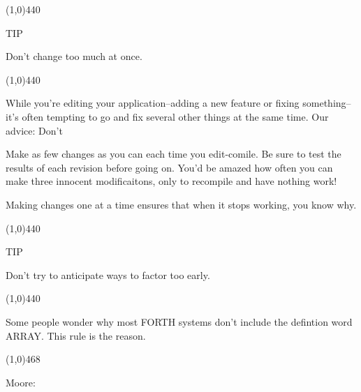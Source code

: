 \documentclass{book}
\begin{document}
\line(1,0){440} 

TIP 

Don't change too much at once.

\line(1,0){440}

\bigskip

\noindent
While you're editing your application--adding a new feature or fixing something--it's often tempting to go and fix several other things at the same time. Our advice: Don't

Make as few changes as you can each time you edit-comile. Be sure to test the results of each revision before going on. You'd be amazed how often you can make three innocent modificaitons, only to recompile and have nothing work!

Making changes one at a time ensures that when it stops working, you know why.

\line(1,0){440} 

TIP 

Don't try to anticipate ways to factor too early.

\line(1,0){440}

\bigskip

\noindent
Some people wonder why most FORTH systems don't include the defintion word ARRAY. This rule is the reason.

\noindent
\line(1,0){468}

\noindent
Moore:
\end{document}
